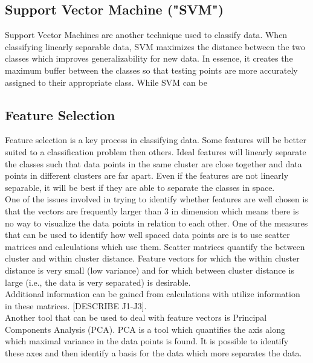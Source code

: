 \documentclass[12pt]{article}
\begin{document}
\subsection{Support Vector Machine ("SVM")}
Support Vector Machines are another technique used to classify data. When classifying linearly separable data, SVM maximizes the distance between the two classes which improves generalizability for new data. In essence, it creates the maximum buffer between the classes so that testing points are more accurately assigned to their appropriate class. While SVM can be 
\subsection{Feature Selection}
Feature selection is a key process in classifying data. Some features will be better suited to a classification problem then others. Ideal features will linearly separate the classes such that data points in the same cluster are close together and data points in different clusters are far apart. Even if the features are not linearly separable, it will be best if they are able to separate the classes in space.\\
One of the issues involved in trying to identify whether features are well chosen is that the vectors are frequently larger than 3 in dimension which means there is no way to visualize the data points in relation to each other. One of the measures that can be used to identify how well spaced data points are is to use scatter matrices and calculations which use them. Scatter matrices quantify the between cluster and within cluster distance. Feature vectors for which the within cluster distance is very small (low variance) and for which between cluster distance is large (i.e., the data is very separated) is desirable. \\
Additional information can be gained from calculations with utilize information in these matrices. [DESCRIBE J1-J3].\\
Another tool that can be used to deal with feature vectors is Principal Components Analysis (PCA). PCA is a tool which quantifies the axis along which maximal variance in the data points is found. It is possible to identify these axes and then identify a basis for the data which more separates the data. 
\end{document}
